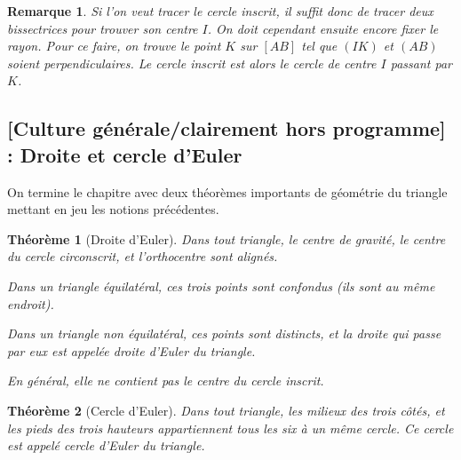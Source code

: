 \documentclass[12 pt]{article}
\theoremstyle{plain}
\newcounter{n}
\numberwithin{n}{section}
\newtheorem{theo}{Théorème}
\newtheorem{rmq}[n]{Remarque}
\begin{document}
\begin{rmq}Si l'on veut tracer le cercle inscrit, il suffit donc de tracer deux bissectrices pour trouver 
son centre $I$. 
On doit cependant ensuite encore fixer le rayon. Pour ce faire, on trouve le point $K$ sur $[AB]$ tel que $(IK)$ et
$(AB)$ soient perpendiculaires. Le cercle inscrit est alors le cercle de centre $I$ passant par $K$.  
\end{rmq}


\subsection{[Culture générale/clairement hors programme] : Droite et cercle d'Euler}

On termine le chapitre avec deux théorèmes importants de géométrie du triangle mettant en jeu les notions précédentes. 

\begin{theo}[Droite d'Euler]
Dans tout triangle, le centre de gravité, le centre du cercle circonscrit, et l'orthocentre sont alignés. 

Dans un triangle équilatéral, ces trois points sont confondus (ils sont au même endroit).

Dans un triangle non équilatéral, ces points sont distincts, et la droite qui passe par eux est appelée \emph{droite
d'Euler} du triangle. 

En général, elle ne contient pas le centre du cercle inscrit.
\end{theo}


\begin{theo}[Cercle d'Euler]

Dans tout triangle, les milieux des trois côtés, et les pieds des trois hauteurs appartiennent tous les six à un 
même cercle. Ce cercle est appelé \emph{cercle d'Euler} du triangle. 

\end{theo}
	
\end{document}
